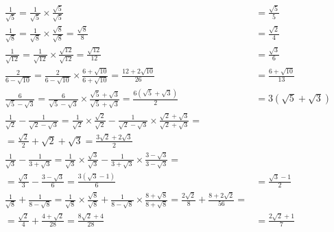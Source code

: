 \documentclass[a4paper,12pt]{article}
\begin{document}
\begin{align*}
\frac{1}{\sqrt{5}}
= \frac{1}{\sqrt{5}} \times \frac{\sqrt{5}}{\sqrt{5}}
&= \frac{\sqrt{5}}{5} \\[6pt]
\frac{1}{\sqrt{8}}
= \frac{1}{\sqrt{8}} \times \frac{\sqrt{8}}{\sqrt{8}}
= \frac{\sqrt{8}}{8}
&= \frac{\sqrt{2}}{4} \\[6pt]
\frac{1}{\sqrt{12}}
= \frac{1}{\sqrt{12}} \times \frac{\sqrt{12}}{\sqrt{12}}
= \frac{\sqrt{12}}{12}
&= \frac{\sqrt{3}}{6} \\[6pt]
\frac{2}{6 - \sqrt{10}}
= \frac{2}{6 - \sqrt{10}} \times \frac{6 + \sqrt{10}}{6 + \sqrt{10}}
= \frac{12 + 2\sqrt{10}}{26}
&= \frac{6 + \sqrt{10}}{13} \\[6pt]
\frac{6}{\sqrt{5} - \sqrt{3}}
= \frac{6}{\sqrt{5} - \sqrt{3}} \times \frac{\sqrt{5} + \sqrt{3}}{\sqrt{5} + \sqrt{3}}
= \frac{6(\sqrt{5} + \sqrt{3})}{2}
&= 3(\sqrt{5} + \sqrt{3}) \\[6pt]
\frac{1}{\sqrt{2}} - \frac{1}{\sqrt{2} - \sqrt{3}}
= \frac{1}{\sqrt{2}} \times \frac{\sqrt{2}}{\sqrt{2}} - \frac{1}{\sqrt{2} - \sqrt{3}} \times \frac{\sqrt{2} + \sqrt{3}}{\sqrt{2} + \sqrt{3}}= \\[6pt]
= \frac{\sqrt{2}}{2} + \sqrt{2} + \sqrt{3}
= \frac{3\sqrt{2} + 2\sqrt{3}}{2} \\[6pt]
\frac{1}{\sqrt{3}} - \frac{1}{3 + \sqrt{3}}
= \frac{1}{\sqrt{3}} \times \frac{\sqrt{3}}{\sqrt{3}} - \frac{1}{3 + \sqrt{3}} \times \frac{3 - \sqrt{3}}{3 - \sqrt{3}}= \\[6pt]
= \frac{\sqrt{3}}{3} - \frac{3 - \sqrt{3}}{6}
= \frac{3(\sqrt{3} - 1)}{6}
&= \frac{\sqrt{3} - 1}{2} \\[6pt]
\frac{1}{\sqrt{8}} + \frac{1}{8 - \sqrt{8}}
= \frac{1}{\sqrt{8}} \times \frac{\sqrt{8}}{\sqrt{8}} + \frac{1}{8 - \sqrt{8}} \times \frac{8 + \sqrt{8}}{8 + \sqrt{8}}
= \frac{2\sqrt{2}}{8} + \frac{8 + 2\sqrt{2}}{56}= \\[6pt]
= \frac{\sqrt{2}}{4} + \frac{4 + \sqrt{2}}{28}
= \frac{8\sqrt{2} + 4}{28}
&= \frac{2\sqrt{2} + 1}{7}
\end{align*}
\end{document}
